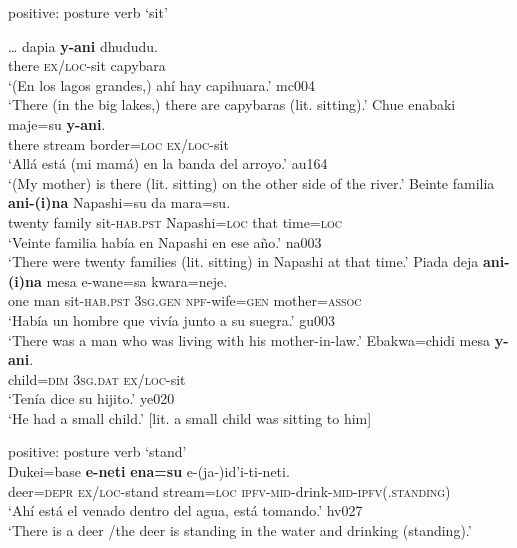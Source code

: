 \documentclass[output=paper,draft,draftmode,colorlinks,citecolor=brown]{langscibook}
\begin{document}
\newpage
\begin{exe}\ex\label{ex:tacana-posture-sit} positive: posture verb `sit'
\begin{xlist}
\ex\label{ex:tacana-posture-sit-capybaras}
\gll \ldots{} dapia \textbf{y-ani} dhududu.\\
    {}  there  \textsc{ex/loc}-sit  capybara\\
\glt `(En los lagos grandes,) ahí hay capihuara.' mc004\\
`There (in the big lakes,) there are capybaras (lit. sitting).'
\ex\label{ex:tacana-posture-sit-mother}
\gll {}Chue enabaki maje=su{\cb} \textbf{y-ani}.\\
    there  stream  border=\textsc{loc}  \textsc{ex/loc}-sit\\
\glt `Allá está (mi mamá) en la banda del arroyo.' au164\\
`(My mother) is there (lit. sitting) on the other side of the river.' 
\ex\label{ex:tacana-posture-sit-families}
\gll {}Beinte familia{\cb} \textbf{ani-(i)na} Napashi=su {\ob}da
mara=su{\cb}.\\
    twenty  family  sit-\textsc{hab.pst}
    Napashi=\textsc{loc}  that  time=\textsc{loc}\\
\glt `Veinte familia había en Napashi en ese año.' na003\\
`There were twenty families (lit. sitting) in Napashi at that time.'
\ex\label{ex:tacana-posture-sit-anoppi}
 \gll {}Piada deja{\cb} \textbf{ani-(i)na}
    mesa e-wane=sa kwara=neje{\cb}.\\
    one  man  sit-\textsc{hab.pst}  \textsc{3sg.gen}
    \textsc{npf}-wife=\textsc{gen}  mother=\textsc{assoc}\\
\glt `Había un hombre que vivía junto a su suegra.' gu003\\
`There was a man who was living with his mother-in-law.'
\ex\label{ex:tacana-posture-sit-child}
 \gll {}Ebakwa=chidi mesa
    \textbf{y-ani}.\\
 child=\textsc{dim}  \textsc{3sg.dat}  \textsc{ex/loc}-sit\\
\glt `Tenía dice su hijito.' ye020\\
`He had a small child.' [lit. a small child was sitting to him]
\end{xlist}

\ex\label{ex:tacana-posture-stand}  positive: posture verb `stand'\\
\gll {}Dukei=base \textbf{e-neti}
\textbf{ena=su} e-(ja-)id'i-ti-neti.\\
    deer=\textsc{depr}  \textsc{ex/loc}-stand  stream=\textsc{loc}
    \textsc{ipfv}-\textsc{mid}-drink-\textsc{mid-ipfv(.standing)}\\
\glt `Ahí está el venado dentro del agua, está tomando.' hv027\\
`There is a deer \slash  the deer is standing in the water and drinking (standing).'


\end{exe}
\end{document}
